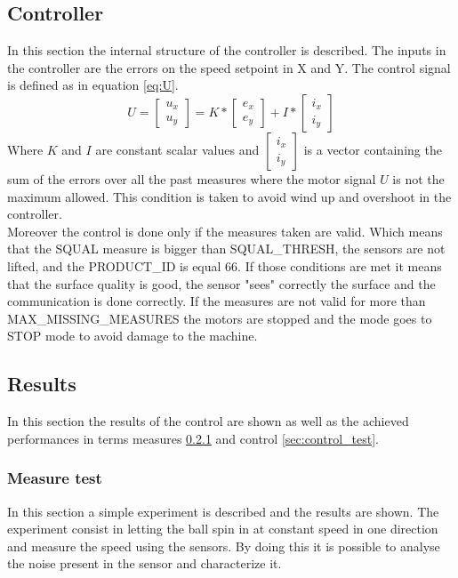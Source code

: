 \documentclass[12pt,a4paper]{article}
\begin{document}
\subsection{Controller} \label{sec:controller}
In this section the internal structure of the controller is described.
The inputs in the controller are the errors on the speed setpoint in X and Y. The control signal is defined as in equation \ref{eq:U}.
\begin{equation}\label{eq:U}
U = 
\begin{bmatrix}
u_x\\
u_y
\end{bmatrix}
= K * 
\begin{bmatrix}
e_x\\
e_y
\end{bmatrix} + I *
\begin{bmatrix}
i_x\\
i_y
\end{bmatrix} 
\end{equation}
Where $K$ and $I$ are constant scalar values and $\begin{bmatrix}i_x\\i_y\end{bmatrix}$ is a vector containing the sum of the errors over all the past measures where the motor signal $U$ is not the maximum allowed. This condition is taken to avoid wind up and overshoot in the controller.\\
Moreover the control is done only if the measures taken are valid. Which means that the SQUAL measure is bigger than SQUAL\_THRESH, the sensors are not lifted, and the PRODUCT\_ID is equal 66.
If those conditions are met it means that the surface quality is good, the sensor "sees" correctly the surface and the communication is done correctly.
If the measures are not valid for more than MAX\_MISSING\_MEASURES the motors are stopped and the mode goes to STOP mode to avoid damage to the machine.
\subsection{Results}
In this section the results of the control are shown as well as the achieved performances in terms measures \ref{sec:measure_test} and control \ref{sec:control_test}.
\subsubsection{Measure test}\label{sec:measure_test}
In this section a simple experiment is described and the results are shown. The experiment consist in letting the ball spin in at constant speed in one direction and measure the speed using the sensors. By doing this it is possible to analyse the noise present in the sensor and characterize it.
\end{document}
